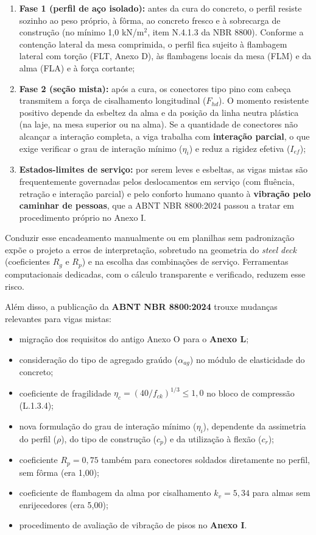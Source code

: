 \begin{enumerate}
\item \textbf{Fase 1 (perfil de aço isolado):} antes da cura do concreto, o perfil resiste sozinho ao peso próprio, à fôrma, ao concreto fresco e à sobrecarga de construção (no mínimo 1,0 kN/m\ensuremath{^2}, item N.4.1.3 da NBR 8800). Conforme a contenção lateral da mesa comprimida, o perfil fica sujeito à flambagem lateral com torção (FLT, Anexo D), às flambagens locais da mesa (FLM) e da alma (FLA) e à força cortante;
\item \textbf{Fase 2 (seção mista):} após a cura, os conectores tipo pino com cabeça transmitem a força de cisalhamento longitudinal ($F_{hd}$). O momento resistente positivo depende da esbeltez da alma e da posição da linha neutra plástica (na laje, na mesa superior ou na alma). Se a quantidade de conectores não alcançar a interação completa, a viga trabalha com \textbf{interação parcial}, o que exige verificar o grau de interação mínimo ($\eta_i$) e reduz a rigidez efetiva ($I_{ef}$);
\item \textbf{Estados-limites de serviço:} por serem leves e esbeltas, as vigas mistas são frequentemente governadas pelos deslocamentos em serviço (com fluência, retração e interação parcial) e pelo conforto humano quanto à \textbf{vibração pelo caminhar de pessoas}, que a ABNT NBR 8800:2024 \cite{abnt8800:2024} passou a tratar em procedimento próprio no Anexo I.
\end{enumerate}

Conduzir esse encadeamento manualmente ou em planilhas sem padronização expõe o projeto a erros de interpretação, sobretudo na geometria do \emph{steel deck} (coeficientes $R_g$ e $R_p$) e na escolha das combinações de serviço. Ferramentas computacionais dedicadas, com o cálculo transparente e verificado, reduzem esse risco.

Além disso, a publicação da \textbf{ABNT NBR 8800:2024} trouxe mudanças relevantes para vigas mistas:
\begin{itemize}
\item migração dos requisitos do antigo Anexo O para o \textbf{Anexo L};
\item consideração do tipo de agregado graúdo ($\alpha_{ag}$) no módulo de elasticidade do concreto;
\item coeficiente de fragilidade $\eta_c = (40/f_{ck})^{1/3} \le 1{,}0$ no bloco de compressão (L.1.3.4);
\item nova formulação do grau de interação mínimo ($\eta_i$), dependente da assimetria do perfil ($\rho$), do tipo de construção ($c_p$) e da utilização à flexão ($c_r$);
\item coeficiente $R_p = 0{,}75$ também para conectores soldados diretamente no perfil, sem fôrma (era 1,00);
\item coeficiente de flambagem da alma por cisalhamento $k_v = 5{,}34$ para almas sem enrijecedores (era 5,00);
\item procedimento de avaliação de vibração de pisos no \textbf{Anexo I}.
\end{itemize}

